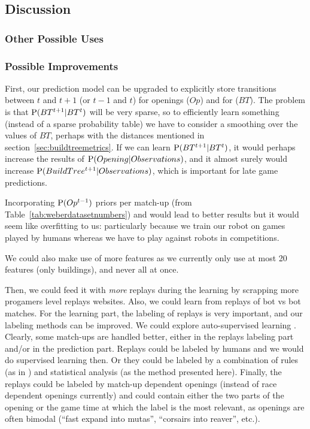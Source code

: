 \subsection{Discussion}
\subsubsection{Other Possible Uses}
\subsubsection{Possible Improvements}

First, our prediction model can be upgraded to explicitly store transitions between $t$ and $t+1$ (or $t-1$ and $t$) for openings ($Op$) and for  ($BT$). The problem is that $\mathrm{P}(BT^{t+1}|BT^t)$ will be very sparse, so to efficiently learn something (instead of a sparse probability table) we have to consider a smoothing over the values of $BT$, perhaps with the distances mentioned in section~\ref{sec:buildtreemetrics}. If we can learn $\mathrm{P}(BT^{t+1}|BT^t)$, it would perhaps increase the results of $\mathrm{P}(Opening|Observations)$, and it almost surely would increase $\mathrm{P}(BuildTree^{t+1}|Observations)$, which is important for late game predictions. 

Incorporating $\mathrm{P}(Op^{t-1})$ priors per match-up (from Table~\ref{tab:weberdatasetnumbers}) and  would lead to better results but it would seem like overfitting to us: particularly because we train our robot on games played by humans whereas we have to play against robots in competitions.

We could also make use of more features as we currently only use at most 20 features (only buildings), and never all at once. 

Then, we could feed it with \textit{more} replays during the learning by scrapping more progamers level replays websites. Also, we could learn from replays of bot vs bot matches. For the learning part, the labeling of replays is very important, and our labeling methods can be improved. 
We could explore auto-supervised learning \citep{AutoSuperLearning}. 
Clearly, some match-ups are handled better, either in the replays labeling part and/or in the prediction part. Replays could be labeled by humans and we would do supervised learning then. Or they could be labeled by a combination of rules (as in \citep{weberStrat}) and statistical analysis (as the method presented here). Finally, the replays could be labeled by match-up dependent openings (instead of race dependent openings currently) and could contain either the two parts of the opening %
or the game time at which the label is the most relevant, as openings are often bimodal (``fast expand into mutas'', ``corsairs into reaver'', etc.).


